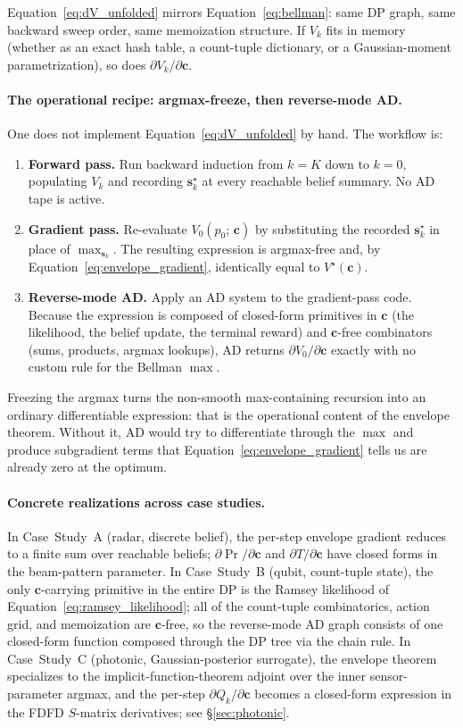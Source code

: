 \documentclass[11pt,a4paper,onecolumn]{article}
\newcommand{\bc}{\bm{c}}
\newcommand{\bs}{\bm{s}}
\begin{document}
Equation~\eqref{eq:dV_unfolded} mirrors Equation~\eqref{eq:bellman}: same DP graph, same backward sweep order, same memoization structure.  If $V_k$ fits in memory (whether as an exact hash table, a count-tuple dictionary, or a Gaussian-moment parametrization), so does $\partial V_k / \partial \bc$.

\paragraph{The operational recipe: argmax-freeze, then reverse-mode AD.}  One does not implement Equation~\eqref{eq:dV_unfolded} by hand.  The workflow is:
\begin{enumerate}[nosep, leftmargin=*]
\item \textbf{Forward pass.}  Run backward induction from $k = K$ down to $k = 0$, populating $V_k$ and recording $\bs_k^\star$ at every reachable belief summary.  No AD tape is active.
\item \textbf{Gradient pass.}  Re-evaluate $V_0(p_0;\, \bc)$ by substituting the recorded $\bs_k^\star$ in place of $\max_{\bs_k}$.  The resulting expression is argmax-free and, by Equation~\eqref{eq:envelope_gradient}, identically equal to $V^\star(\bc)$.
\item \textbf{Reverse-mode AD.}  Apply an AD system to the gradient-pass code.  Because the expression is composed of closed-form primitives in $\bc$ (the likelihood, the belief update, the terminal reward) and $\bc$-free combinators (sums, products, argmax lookups), AD returns $\partial V_0 / \partial \bc$ exactly with no custom rule for the Bellman $\max$.
\end{enumerate}
Freezing the argmax turns the non-smooth max-containing recursion into an ordinary differentiable expression: that is the operational content of the envelope theorem.  Without it, AD would try to differentiate through the $\max$ and produce subgradient terms that Equation~\eqref{eq:envelope_gradient} tells us are already zero at the optimum.

\paragraph{Concrete realizations across case studies.}  In Case~Study~A (radar, discrete belief), the per-step envelope gradient reduces to a finite sum over reachable beliefs; $\partial \Pr / \partial \bc$ and $\partial T / \partial \bc$ have closed forms in the beam-pattern parameter.  In Case~Study~B (qubit, count-tuple state), the only $\bc$-carrying primitive in the entire DP is the Ramsey likelihood of Equation~\eqref{eq:ramsey_likelihood}; all of the count-tuple combinatorics, action grid, and memoization are $\bc$-free, so the reverse-mode AD graph consists of one closed-form function composed through the DP tree via the chain rule.  In Case~Study~C (photonic, Gaussian-posterior surrogate), the envelope theorem specializes to the implicit-function-theorem adjoint over the inner sensor-parameter argmax, and the per-step $\partial Q_k / \partial \bc$ becomes a closed-form expression in the FDFD $S$-matrix derivatives; see §\ref{sec:photonic}.
\end{document}
